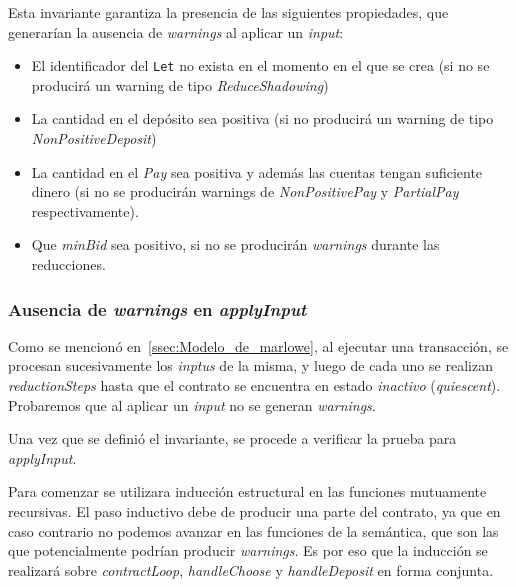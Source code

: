 \documentclass[12pt]{book}
\begin{document}
Esta invariante garantiza la presencia de las siguientes propiedades, que generarían la ausencia de \textit{warnings} al aplicar un \textit{input}:
\begin{itemize}
    \item El identificador del \texttt{Let} no exista en el momento en el que se crea (si no se producirá un warning de tipo \textit{ReduceShadowing})
    \item La cantidad en el depósito sea positiva (si no producirá un warning de tipo \textit{NonPositiveDeposit})
    \item La cantidad en el \textit{Pay} sea positiva y además las cuentas tengan suficiente dinero (si no se producirán warnings de \textit{NonPositivePay} y \textit{PartialPay} respectivamente).
    \item Que \textit{minBid} sea positivo, si no se producirán \textit{warnings} durante las reducciones.
\end{itemize}

\subsubsection{Ausencia de \textit{warnings} en \textit{applyInput}}

Como se mencionó en~\ref{ssec:Modelo_de_marlowe}, al ejecutar una transacción, se procesan sucesivamente los \textit{inptus} de la misma, y luego de cada uno se realizan \textit{reductionSteps} hasta que el contrato se encuentra en estado \textit{inactivo} (\textit{quiescent}). Probaremos que al aplicar un \textit{input} no se generan \textit{warnings}.

Una vez que se definió el invariante, se procede a verificar la prueba para \textit{applyInput}. 

Para comenzar se utilizara inducción estructural en las funciones mutuamente recursivas. El paso inductivo debe de producir una parte del contrato, ya que en caso contrario no podemos avanzar en las funciones de la semántica, que son las que potencialmente podrían producir \textit{warnings}. Es por eso que la inducción se realizará sobre \textit{contractLoop}, \textit{handleChoose} y \textit{handleDeposit} en forma conjunta.
\end{document}
